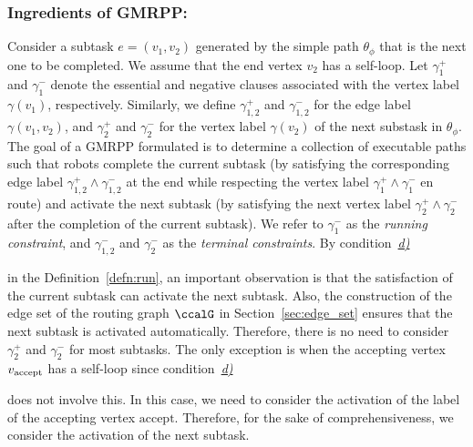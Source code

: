 \documentclass[Afour,sageh,times]{sagej}
\newcommand{\autop}{\ccalA_{\phi}}
\newcommand{\vertex}[1]{v_{\textup{#1}}}
\newcommand{\domanda}[1]{\subsubsection*{#1}}
\begin{document}
{{ %

 \subsubsection{Ingredients of GMRPP:}\label{sec:gmmpp1} Consider a subtask $e = (v_1, v_2)$ generated by the simple path $\theta_\phi$ that is the next one to be completed. We assume that the end vertex $v_2$ has a self-loop. Let $\gamma_1^+$ and $\gamma_1^-$ denote the essential and negative clauses associated with the vertex label $\gamma(v_1)$, respectively. Similarly, we define  $\gamma_{1,2}^{+}$ and $\gamma_{1,2}^{-}$  for the edge label $\gamma(v_1, v_2)$, and  $\gamma_2^+$ and $\gamma_2^-$ for the vertex label $\gamma(v_2)$ of the next substask in $\theta_\phi$. The goal of a GMRPP formulated  is to determine a collection of executable paths such that robots complete the current subtask (by satisfying the corresponding edge label $\gamma_{1,2}^+ \wedge \gamma_{1,2}^-$ at the end while respecting the vertex label $\gamma_1^+ \wedge \gamma_1^-$ en route) and activate the next subtask (by satisfying the next vertex label $\gamma_2^{+}\wedge \gamma_2^{-}$ after the completion of the current subtask). We refer to $\gamma_1^-$ as the {\it running constraint}, and $\gamma_{1,2}^- $ and $ \gamma_2^{-}$ as the {\it terminal constraints}. By condition~\hyperref[cond:d]{\it d)}} in the Definition~\ref{defn:run}, an important observation is that the satisfaction of the current subtask can activate the next subtask. Also, the construction of the edge set of the routing graph $\ccalG$ in Section~\ref{sec:edge_set} ensures that the next subtask is activated automatically. Therefore, there is no need to consider $\gamma_2^+$ and $\gamma_2^-$ for most subtasks. The only exception is  when the accepting vertex $\vertex{accept}$ has a self-loop since condition~\hyperref[cond:d]{\it d)}} does not involve this. In this case, we need to consider the activation of the label of the accepting vertex $\text{accept}$. Therefore, for the sake of comprehensiveness, we consider the activation of the next subtask.
\end{document}
